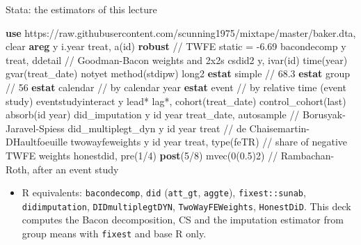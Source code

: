 \documentclass[
  11pt,
  ignorenonframetext,
  aspectratio=169,
]{beamer}
\newenvironment{Shaded}{\begin{snugshade}}{\end{snugshade}}
\newcommand{\CommentTok}[1]{\textcolor[rgb]{0.37,0.37,0.37}{#1}}
\newcommand{\DecValTok}[1]{\textcolor[rgb]{0.68,0.00,0.00}{#1}}
\newcommand{\FunctionTok}[1]{\textcolor[rgb]{0.28,0.35,0.67}{#1}}
\newcommand{\KeywordTok}[1]{\textcolor[rgb]{0.00,0.23,0.31}{\textbf{#1}}}
\newcommand{\NormalTok}[1]{\textcolor[rgb]{0.00,0.23,0.31}{#1}}
\providecommand{\tightlist}{%
  \setlength{\itemsep}{0pt}\setlength{\parskip}{0pt}}
\begin{document}
\begin{frame}[fragile]{Stata: the estimators of this lecture}
\protect{}\label{stata-the-estimators-of-this-lecture}
\begin{Shaded}
\begin{Highlighting}[]
\KeywordTok{use}\NormalTok{ https:}\CommentTok{//raw.githubusercontent.com/scunning1975/mixtape/master/baker.dta, clear}
\KeywordTok{areg} \FunctionTok{y}\NormalTok{ i.}\FunctionTok{year}\NormalTok{ treat, a(id) }\KeywordTok{robust}                    \CommentTok{// TWFE static = {-}6.69}
\NormalTok{bacondecomp }\FunctionTok{y}\NormalTok{ treat, ddetail                         }\CommentTok{// Goodman{-}Bacon weights and 2x2s}
\NormalTok{csdid2 }\FunctionTok{y}\NormalTok{, ivar(id) time(}\FunctionTok{year}\NormalTok{) gvar(treat\_date) notyet method(stdipw) long2}
\KeywordTok{estat}\NormalTok{ simple                                         }\CommentTok{// 68.3}
\KeywordTok{estat} \FunctionTok{group}                                          \CommentTok{// 56}
\KeywordTok{estat}\NormalTok{ calendar                                       }\CommentTok{// by calendar year}
\KeywordTok{estat}\NormalTok{ event                                          }\CommentTok{// by relative time (event study)}
\NormalTok{eventstudyinteract }\FunctionTok{y}\NormalTok{ lead* lag*, cohort(treat\_date) control\_cohort(}\FunctionTok{last}\NormalTok{) absorb(id }\FunctionTok{year}\NormalTok{)}
\NormalTok{did\_imputation }\FunctionTok{y}\NormalTok{ id }\FunctionTok{year}\NormalTok{ treat\_date, autosample      }\CommentTok{// Borusyak{-}Jaravel{-}Spiess}
\NormalTok{did\_multiplegt\_dyn }\FunctionTok{y}\NormalTok{ id }\FunctionTok{year}\NormalTok{ treat                   }\CommentTok{// de Chaisemartin{-}D\textquotesingle{}Haultfoeuille}
\NormalTok{twowayfeweights }\FunctionTok{y}\NormalTok{ id }\FunctionTok{year}\NormalTok{ treat, }\DecValTok{type}\NormalTok{(feTR)          }\CommentTok{// share of negative TWFE weights}
\NormalTok{honestdid, pre(1/4) }\KeywordTok{post}\NormalTok{(5/8) mvec(0(0.5)2)          }\CommentTok{// Rambachan{-}Roth, after an event study}
\end{Highlighting}
\end{Shaded}

\begin{itemize}
\tightlist
\item
  R equivalents: \texttt{bacondecomp}, \texttt{did} (\texttt{att\_gt},
  \texttt{aggte}), \texttt{fixest::sunab}, \texttt{didimputation},
  \texttt{DIDmultiplegtDYN}, \texttt{TwoWayFEWeights},
  \texttt{HonestDiD}. This deck computes the Bacon decomposition, CS and
  the imputation estimator from group means with \texttt{fixest} and
  base R only.
\end{itemize}
\end{frame}
\end{document}
